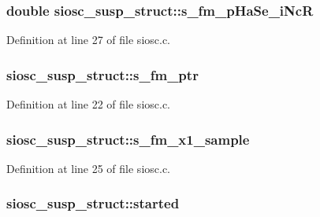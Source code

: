\subsubsection[{\texorpdfstring{s\+\_\+fm\+\_\+p\+Ha\+Se\+\_\+i\+NcR}{s_fm_pHaSe_iNcR}}]{\setlength{\rightskip}{0pt plus 5cm}double siosc\+\_\+susp\+\_\+struct\+::s\+\_\+fm\+\_\+p\+Ha\+Se\+\_\+i\+NcR}\hypertarget{structsiosc__susp__struct_a8664e99de2833ca9db5ff5707f2849ea}{}\label{structsiosc__susp__struct_a8664e99de2833ca9db5ff5707f2849ea}


Definition at line 27 of file siosc.\+c.

\subsubsection[{\texorpdfstring{s\+\_\+fm\+\_\+ptr}{s_fm_ptr}}]{ siosc\+\_\+susp\+\_\+struct\+::s\+\_\+fm\+\_\+ptr}\hypertarget{structsiosc__susp__struct_afada00ea0bd1affe0f9f06b20874bd09}{}\label{structsiosc__susp__struct_afada00ea0bd1affe0f9f06b20874bd09}


Definition at line 22 of file siosc.\+c.

\subsubsection[{\texorpdfstring{s\+\_\+fm\+\_\+x1\+\_\+sample}{s_fm_x1_sample}}]{ siosc\+\_\+susp\+\_\+struct\+::s\+\_\+fm\+\_\+x1\+\_\+sample}\hypertarget{structsiosc__susp__struct_a3451ca6c7b882c49f77fed23abf8305f}{}\label{structsiosc__susp__struct_a3451ca6c7b882c49f77fed23abf8305f}


Definition at line 25 of file siosc.\+c.

\subsubsection[{\texorpdfstring{started}{started}}]{ siosc\+\_\+susp\+\_\+struct\+::started}\hypertarget{structsiosc__susp__struct_a5b4f002379c04f72c17a4e47c6cb3053}{}\label{structsiosc__susp__struct_a5b4f002379c04f72c17a4e47c6cb3053}


